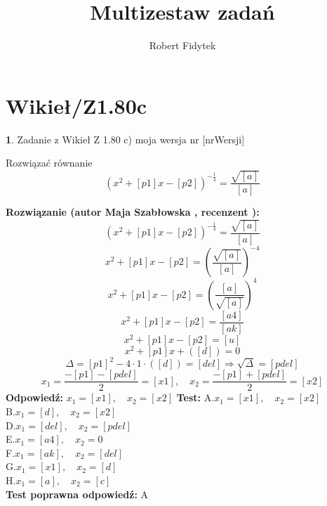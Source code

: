 \documentclass[12pt, a4paper]{article}
\title{Multizestaw zadań}
\author{Robert Fidytek}
\date{}
\theoremstyle{definition} %
\newtheorem{zad}{}
\newcommand{\kategoria}[1]{\section{#1}} %
\newcommand{\zadStart}[1]{\begin{zad}#1\newline} %
\newcommand{\zadStop}{\end{zad}}   %
\newcommand{\rozwStart}[2]{\noindent \textbf{Rozwiązanie (autor #1 , recenzent #2): }\newline} %
\newcommand{\rozwStop}{\newline}                                            %
\newcommand{\odpStart}{\noindent \textbf{Odpowiedź:}\newline}    %
\newcommand{\odpStop}{\newline}                                             %
\newcommand{\testStart}{\noindent \textbf{Test:}\newline} %
\newcommand{\testStop}{\newline} %
\newcommand{\kluczStart}{\noindent \textbf{Test poprawna odpowiedź:}\newline} %
\newcommand{\kluczStop}{\newline} %
\begin{document}
\maketitle


\kategoria{Wikieł/Z1.80c}
\zadStart{Zadanie z Wikieł Z 1.80 c)  moja wersja nr [nrWersji]}



Rozwiązać równanie 
$$(x^{2}+[p1]x-[p2])^{-\frac{1}{4}}=\frac{\sqrt{[a]}}{[a]}$$
\zadStop

\rozwStart{Maja Szabłowska}{}
$$(x^{2}+[p1]x-[p2])^{-\frac{1}{4}}=\frac{\sqrt{[a]}}{[a]}$$
$$x^{2}+[p1]x-[p2]=\left(\frac{\sqrt{[a]}}{[a]}\right)^{-4}$$
$$x^{2}+[p1]x-[p2]=\left(\frac{[a]}{\sqrt{[a]}}\right)^{4}$$
$$x^{2}+[p1]x-[p2]=\frac{[a4]}{[ak]}$$
$$x^{2}+[p1]x-[p2]=[u]$$
$$x^{2}+[p1]x+([d])=0$$
$$\Delta=[p1]^2 - 4\cdot1\cdot([d])=[del]\Rightarrow \sqrt{\Delta}=[pdel]$$
$$x_{1}=\frac{-[p1]-[pdel]}{2}=[x1], \quad x_{2}=\frac{-[p1]+[pdel]}{2}=[x2]$$
\rozwStop
\odpStart
$x_{1}=[x1], \quad x_{2}=[x2]$
\odpStop
\testStart
A.$x_{1}=[x1], \quad x_{2}=[x2]$\\
B.$x_{1}=[d], \quad x_{2}=[x2]$\\
D.$x_{1}=[del], \quad x_{2}=[pdel]$\\
E.$x_{1}=[a4], \quad x_{2}=0$\\
F.$x_{1}=[ak], \quad x_{2}=[del]$\\
G.$x_{1}=[x1], \quad x_{2}=[d]$\\
H.$x_{1}=[a], \quad x_{2}=[c]$\\
\testStop
\kluczStart
A
\kluczStop
\end{document}
